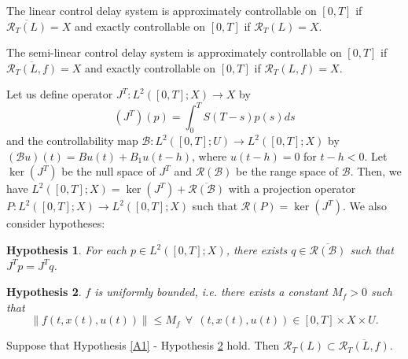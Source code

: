 \documentclass[12pt]{llncs}
\newtheorem{hp}{Hypothesis}
\begin{document}

\begin{definition}
The linear control delay system is approximately controllable on $ [0,T] $ if $ \overline{\mathcal{R}_T(L)} = X $ and exactly controllable on $ [0,T] $ if $ \mathcal{R}_T(L) = X $.
\end{definition}

\begin{definition}
	The semi-linear control delay system is approximately controllable on $ [0,T] $ if $ \overline{\mathcal{R}_T(L,f)} = X $ and exactly controllable on $ [0,T] $ if $ \mathcal{R}_T(L,f) = X $.
\end{definition}
Let us define operator $ J^T:L^{2}([0,T]; X) \rightarrow X $ by
\begin{equation*}
		(J^T)(p)=\int_{0}^{T} {S}(T-s)p(s)ds
\end{equation*}
and the controllability map $\mathcal{B} : L^{2}([0,T]; U) \rightarrow L^{2}([0,T]; X)$ by $(\mathcal{B} u)(t) = B u(t) + B_1 u(t-h)$, where $u(t-h) = 0$ for $t-h < 0$. Let $\ker(J^T)$ be the null space of $J^T$ and $ \mathcal{R}(\mathcal{B}) $ be the range space of $\mathcal{B}$. Then, we have $L^{2}([0,T]; X) = \ker(J^T) + \overline{\mathcal{R}(\mathcal{B})}$ with a projection operator $P: L^{2}([0,T]; X) \rightarrow L^{2}([0,T]; X)$ such that $\mathcal{R}(P)=\ker(J^T)$. We also consider hypotheses:
\begin{hp}\label{B1}
	For each $p \in L^{2}([0,T]; X)$, there exists $q \in \overline{\mathcal{R}(\mathcal{B})}$ such that $J^Tp=J^Tq$.
\end{hp}

\begin{hp}\label{f2}
	$f$ is uniformly bounded, i.e. there exists a constant $M_f>0$ such that
	\begin{equation*}
		\| f(t,x(t),u(t)) \| \leq M_f ~~ \forall ~~ (t,x(t),u(t)) \in [0,T] \times X \times U.
	\end{equation*}
\end{hp}

\begin{theorem}
Suppose that Hypothesis \ref{A1} - Hypothesis \ref{f2} hold. Then $\mathcal{R}_T(L) \subset \overline{\mathcal{R}_T(L,f)}$.
\end{theorem}
\end{document}
